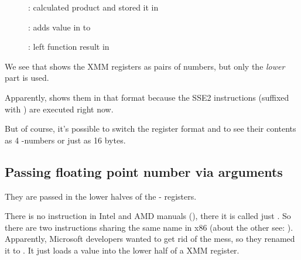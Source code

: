 \clearpage
\begin{figure}[H]
\centering
{}
\caption{\olly:  calculated \gls{product} and stored it
in }
\label{fig:FPU_SIMD_simple_olly3}
\end{figure}

\clearpage
\begin{figure}[H]
\centering
{}
\caption{\olly:  adds value in  to }
\label{fig:FPU_SIMD_simple_olly4}
\end{figure}

\clearpage
\begin{figure}[H]
\centering
{}
\caption{\olly: \FLD left function result in }
\label{fig:FPU_SIMD_simple_olly5}
\end{figure}

We see that \olly shows the XMM registers as pairs of \Tdouble numbers,
but only the \emph{lower} part is used.

Apparently, \olly shows them in that format because the SSE2 instructions (suffixed with ) 
are executed right now.

But of course, it's possible to switch the register format and to see their contents as
4 \Tfloat{}-numbers or just as 16 bytes.

\clearpage
\subsection{Passing floating point number via arguments}



They are passed in the lower halves
of the - registers.



There is no  instruction in Intel and AMD  manuals (), there it is called just .
So there are two instructions sharing the same name in x86 (about the other see: ).
Apparently, Microsoft developers wanted to get rid of the mess, so they renamed it to .
It just loads a value into the lower half of a XMM register.

